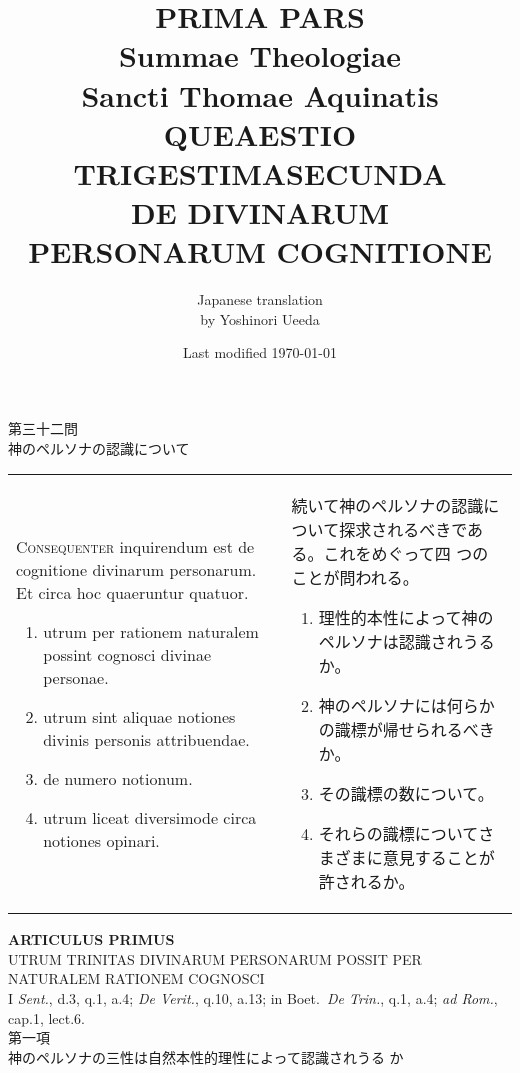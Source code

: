 \documentclass[10pt]{jsarticle} %
\title{{\bf PRIMA PARS}\\{\HUGE Summae Theologiae}\\Sancti Thomae
Aquinatis\\{\sffamily QUEAESTIO TRIGESTIMASECUNDA}\\DE DIVINARUM
PERSONARUM COGNITIONE}
\author{Japanese translation\\by Yoshinori {\sc Ueeda}}
\date{Last modified \today}
\begin{document}
\maketitle

\begin{center}
{\Large 第三十二問\\神のペルソナの認識について}
\end{center}


\begin{longtable}{p{21em}p{21em}}

{\Huge C}{\scshape onsequenter} inquirendum est de cognitione divinarum personarum. Et
 circa hoc quaeruntur quatuor. 

\begin{enumerate}
 \item utrum per rationem naturalem possint cognosci divinae personae. 
 \item utrum sint aliquae notiones divinis personis attribuendae.
 \item de numero notionum.
 \item utrum liceat diversimode circa notiones opinari.
\end{enumerate}


&

続いて神のペルソナの認識について探求されるべきである。これをめぐって四
 つのことが問われる。


\begin{enumerate}
 \item 理性的本性によって神のペルソナは認識されうるか。
 \item 神のペルソナには何らかの識標が帰せられるべきか。
 \item その識標の数について。
 \item それらの識標についてさまざまに意見することが許されるか。
\end{enumerate}

\end{longtable}



\newpage



\begin{center}
{\Large {\bf ARTICULUS PRIMUS}}\\
{\large UTRUM TRINITAS DIVINARUM PERSONARUM POSSIT PER NATURALEM
 RATIONEM COGNOSCI}\\
{\footnotesize I {\itshape Sent.}, d.3, q.1, a.4; {\itshape De
 Verit.}, q.10, a.13; in Boet.~{\itshape De Trin.}, q.1, a.4;
 {\itshape ad Rom.}, cap.1, lect.6.}\\
{\Large 第一項\\神のペルソナの三性は自然本性的理性によって認識されうる
 か}
\end{center}
\end{document}
